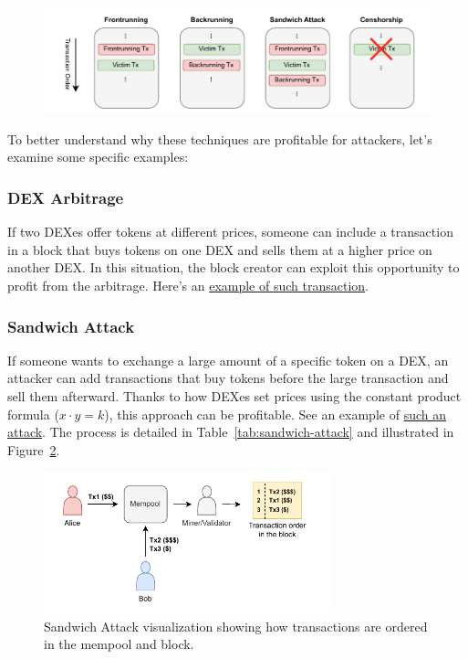 \documentclass[12pt]{article}
\begin{document}
\begin{figure}[H]
  \centering
  \includegraphics[width=1\textwidth]{MEV.pdf}
  \label{fig:sandwich}
\end{figure}

\noindent
To better understand why these techniques are profitable for attackers, let's examine some specific examples:

\subsubsection*{DEX Arbitrage} If two DEXes offer tokens at different prices, someone can include a transaction in a block that buys tokens on one DEX and sells them at a higher price on another DEX. In this situation, the block creator can exploit this opportunity to profit from the arbitrage. Here's an \href{https://etherscan.io/tx/0x5e1657ef0e9be9bc72efefe59a2528d0d730d478cfc9e6cdd09af9f997bb3ef4}{example of such transaction}.

\subsubsection*{Sandwich Attack}
If someone wants to exchange a large amount of a specific token on a DEX, an attacker can add transactions that buy tokens before the large transaction and sell them afterward. Thanks to how DEXes set prices using the constant product formula ($x \cdot y = k$), this approach can be profitable. See an example of \href{https://eigenphi.io/mev/ethereum/tx/0x90204899500606f717cacd223fc27b2be0e017032c7f41986cfb094e686630b4}{such an attack}. The process is detailed in Table~\ref{tab:sandwich-attack} and illustrated in Figure~\ref{fig:sandwich}.

\begin{figure}[H]
  \centering
  \includegraphics[width=0.75\textwidth]{sandwich.pdf}
  \caption{Sandwich Attack visualization showing how transactions are ordered in the mempool and block.}
  \label{fig:sandwich}
\end{figure}
\end{document}
